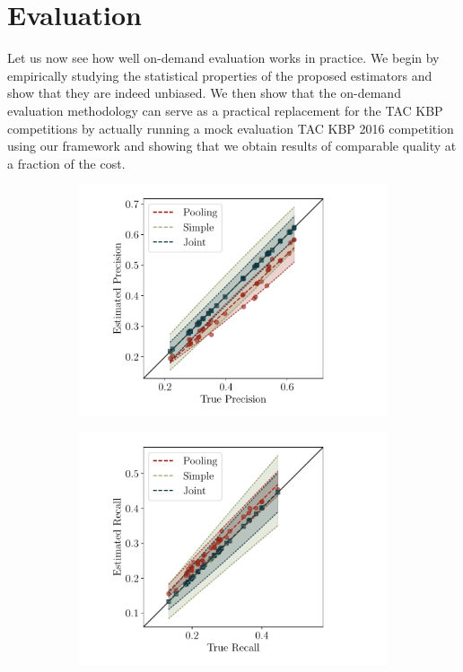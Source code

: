\section{Evaluation}
\label{sec:evaluation}

Let us now see how well on-demand evaluation works in practice.
We begin by empirically studying the statistical properties of the proposed estimators and show that they are indeed unbiased.
We then show that the on-demand evaluation methodology can serve as a practical replacement for the TAC KBP competitions by actually running a mock evaluation TAC KBP 2016 competition using our framework and showing that we obtain results of comparable quality at a fraction of the cost.

\begin{figure}[t]
  \centering
  \begin{subfigure}{0.49\textwidth}
    \includegraphics[width=\textwidth]{figures/simulation/simulation-p}
  \end{subfigure}
  \begin{subfigure}{0.49\textwidth}
    \includegraphics[width=\textwidth]{figures/simulation/simulation-r}

\end{subfigure}
\end{figure}
